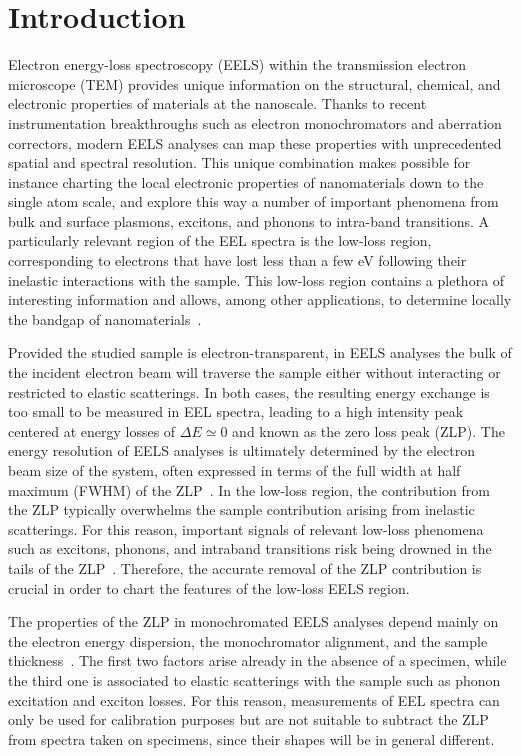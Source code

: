 \section{Introduction}
\label{sec:introduction}

Electron energy-loss spectroscopy (EELS) within the transmission electron microscope (TEM) provides unique information on the structural, chemical, and electronic properties of materials at the nanoscale.
%
Thanks to recent instrumentation breakthroughs
such as electron monochromators and aberration correctors,
modern EELS analyses can map these properties with unprecedented spatial and spectral resolution.
%
This unique combination makes possible for instance charting the local
electronic properties of nanomaterials
down to the single atom scale, and explore this way a number of
important phenomena
from bulk and surface plasmons, excitons,
and phonons to intra-band transitions.
%
A particularly relevant region of the EEL spectra is
the low-loss region, corresponding to electrons that have lost
less than a few eV following their inelastic interactions
with the sample.
%
This low-loss region contains a plethora of interesting
information and allows, among other applications,
to determine locally the bandgap of nanomaterials~\cite{Stoger:2008}.

Provided the studied sample is electron-transparent,
in EELS analyses
the bulk of the incident electron beam will traverse the sample
either without interacting or restricted to elastic scatterings.
%
In both cases, the resulting energy exchange is too small
to be measured in EEL spectra, leading to a 
 high intensity peak centered at energy losses
of $\Delta E\simeq 0$ and known as the zero loss peak (ZLP).
%
The energy resolution of EELS analyses is ultimately determined by
the electron beam size of the system, often expressed in terms
of the full width at half maximum (FWHM) of the
ZLP~\cite{Egerton:2009}.
%
In the low-loss region, the contribution from the ZLP
typically overwhelms the sample contribution arising
from inelastic scatterings.
%
For this reason, important signals of relevant low-loss phenomena such as excitons,
phonons, and intraband transitions risk being drowned
in the tails of the ZLP~\cite{Abajo:2010}.
%
Therefore, the accurate removal of the ZLP
contribution is crucial  in order to  chart the  features
of the low-loss EELS region. 

The properties of the ZLP in monochromated EELS analyses depend mainly on the electron energy dispersion, the monochromator alignment, and the sample thickness~\cite{Park:2008, Stoger:2008}.
%
The first two factors arise already in the absence of a specimen, while the third one is associated
to elastic scatterings with the sample such as  phonon excitation and exciton losses.
%
For this reason, measurements of EEL spectra can only be used for calibration purposes
but are not suitable
to subtract the ZLP from spectra taken on specimens, since their shapes will be in general
different.

